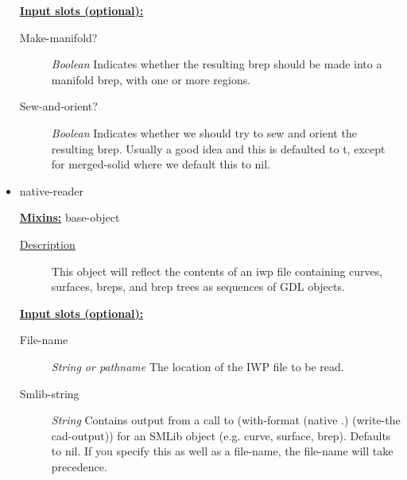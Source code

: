 \documentclass [11pt]{book}
\begin{document}
\begin{itemize}
\textbf{
\underline{Input slots (optional):}}

\begin{description}

\item [Make-manifold?]
\emph{Boolean} Indicates whether the resulting brep should be made into a manifold brep, with one or more regions.


\item [Sew-and-orient?]
\emph{Boolean} Indicates whether we should try to sew and orient the resulting brep. Usually a good idea
and this is defaulted to t, except for merged-solid where we default this to nil.


\end{description}







\item {}native-reader


\textbf{
\underline{Mixins:}} base-object





\begin{description}

\item [
\underline{Description}]


This object will reflect the contents of an iwp file containing
curves, surfaces, breps, and brep trees as sequences of GDL objects. 




\end{description}








\textbf{
\underline{Input slots (optional):}}

\begin{description}

\item [File-name]
\emph{String or pathname} The location of the IWP file to be read.


\item [Smlib-string]
\emph{String} Contains output from a call to (with-format (native .) (write-the cad-output))
for an SMLib object (e.g. curve, surface, brep). Defaults to nil. If you specify this as well as a
file-name, the file-name will take precedence.



\end{description}
\end{itemize}
\end{document}
